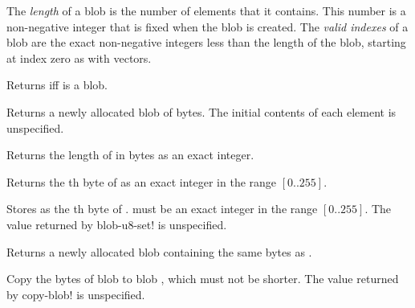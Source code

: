 \vest The {\em length} of a blob is the number of elements that it
contains.  This number is a non-negative integer that is fixed when
the blob is created.  The {\em valid indexes} of
a blob are the exact non-negative integers less than the length of the
blob, starting at index zero as with vectors.

\begin{entry}{%
}

Returns \schtrue{} iff  is a blob.
\end{entry}

\begin{entry}{%
}

Returns a newly allocated blob of  bytes.  The initial contents
of each element is unspecified.
\end{entry}

\begin{entry}{%
}

Returns the length of  in bytes as an exact integer.
\end{entry}

\begin{entry}{%
}

Returns the th byte of  as an exact integer in the
range $[0..255]$.
\end{entry}

\begin{entry}{%
}

Stores  as the th byte of .   must be
an exact integer in the range $[0..255]$.  The value returned by
{\cf blob-u8-set!} is unspecified.
\end{entry}

\begin{entry}{%
}

Returns a newly allocated blob containing the same bytes as
.
\end{entry}

\begin{entry}{%
}

Copy the bytes of blob  to blob , which must not be
shorter.  The value returned by {\cf copy-blob!} is unspecified.
\end{entry}

